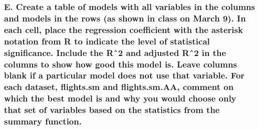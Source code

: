 \documentclass[
]{article}
\begin{document}
\hypertarget{e.-create-a-table-of-models-with-all-variables-in-the-columns-and-models-in-the-rows-as-shown-in-class-on-march-9.-in-each-cell-place-the-regression-coefficient-with-the-asterisk-notation-from-r-to-indicate-the-level-of-statistical-significance.-include-the-rux2c62-and-adjusted-rux2c62-in-the-columns-to-show-how-good-this-model-is.-leave-columns-blank-if-a-particular-model-does-not-use-that-variable.-for-each-dataset-flights.sm-and-flights.sm.aa-comment-on-which-the-best-model-is-and-why-you-would-choose-only-that-set-of-variables-based-on-the-statistics-from-the-summary-function.}{%
\subsubsection{E. Create a table of models with all variables in the
columns and models in the rows (as shown in class on March 9). In each
cell, place the regression coefficient with the asterisk notation from R
to indicate the level of statistical significance. Include the Rˆ2 and
adjusted Rˆ2 in the columns to show how good this model is. Leave
columns blank if a particular model does not use that variable. For each
dataset, flights.sm and flights.sm.AA, comment on which the best model
is and why you would choose only that set of variables based on the
statistics from the summary
function.}\label{e.-create-a-table-of-models-with-all-variables-in-the-columns-and-models-in-the-rows-as-shown-in-class-on-march-9.-in-each-cell-place-the-regression-coefficient-with-the-asterisk-notation-from-r-to-indicate-the-level-of-statistical-significance.-include-the-rux2c62-and-adjusted-rux2c62-in-the-columns-to-show-how-good-this-model-is.-leave-columns-blank-if-a-particular-model-does-not-use-that-variable.-for-each-dataset-flights.sm-and-flights.sm.aa-comment-on-which-the-best-model-is-and-why-you-would-choose-only-that-set-of-variables-based-on-the-statistics-from-the-summary-function.}}
\end{document}
